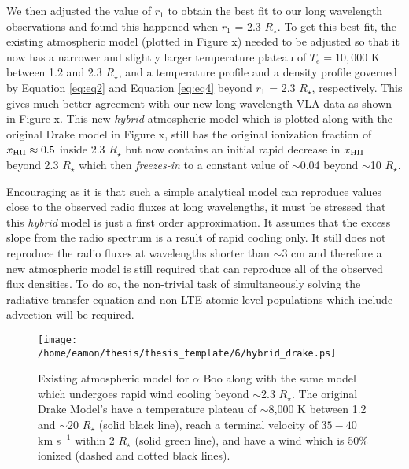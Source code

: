 We then adjusted the value of $r_{1}$ to obtain the best fit to our long wavelength observations and found this happened when $r_{1}$ = 2.3 $R_{\star}$. To get this best fit, the existing atmospheric model (plotted in Figure x) needed to be adjusted so that it now has a narrower and slightly larger temperature plateau of $T_e = 10,000$ K between 1.2 and 2.3 $R_{\star}$, and a temperature profile and a density profile governed by Equation \ref{eq:eq2} and Equation \ref{eq:eq4} beyond $r_{1}$ = 2.3 $R_{\star}$, respectively. This gives much better agreement with our new long wavelength VLA data as shown in Figure x. This new \textit{hybrid} atmospheric model which is plotted along with the original Drake model in Figure x, still has the original ionization fraction of $x_{\rm{HII}} \approx 0.5$ inside 2.3 $R_{\star}$ but now contains an initial rapid decrease in $x_{\rm{HII}}$ beyond 2.3 $R_{\star}$ which then \textit{freezes-in} to a constant value of $\sim$0.04 beyond $\sim$10 $R_{\star}$.

Encouraging as it is that such a simple analytical model can reproduce values close to the observed radio fluxes at long wavelengths, it must be stressed that this \textit{hybrid} model is just a first order approximation. It assumes that the excess slope from the radio spectrum is a result of rapid cooling only. It still does not reproduce the radio fluxes at wavelengths shorter than $\sim$3 cm and therefore a new atmospheric model is still required that can reproduce all of the observed flux densities. To do so, the non-trivial task of simultaneously solving the radiative transfer equation and non-LTE atomic level populations which include advection will be required.

\begin{figure}[hbt!]
\centering 
          \texttt{[image: /home/eamon/thesis/thesis\_template/6/hybrid\_drake.ps]}
\caption[Hybrid Drake model which undergoes rapid wind cooling beyond $\sim$2.3 $R_{\star}$.]{Existing atmospheric model for $\alpha$ Boo \cite[`model A']{drake_1985} along with the same model which undergoes rapid wind cooling beyond $\sim$2.3 $R_{\star}$. The original Drake Model's have a temperature plateau of $\sim$8,000 K between 1.2 and $\sim$20 $R_{\star}$ (solid black line), reach a terminal velocity of $35-40$ km s$^{-1}$ within 2 $R_{\star}$ (solid green line), and have a wind which is 50\% ionized (dashed and dotted black lines).}
\label{fig6.9.3}
\end{figure}